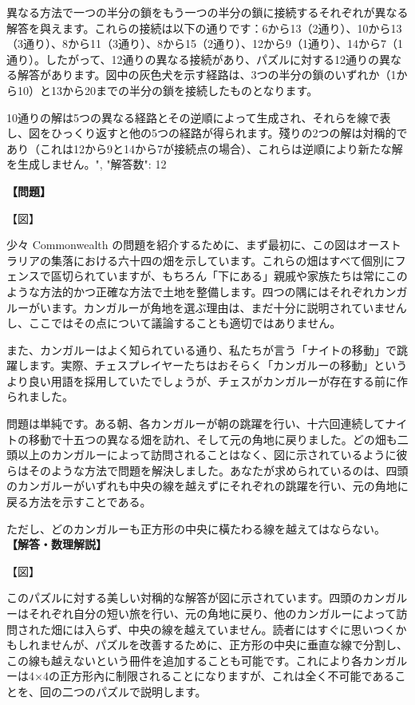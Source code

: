 \documentclass[10pt,a4paper,oneside,openany]{ltjsbook}
\begin{document}
\begin{tcolorbox}[colback=softblue,colframe=primaryblue,title=\textbf{第 336 問：THE GREYHOUND PUZZLE.},arc=2mm,boxrule=1pt,breakable]
{異なる方法で一つの半分の鎖をもう一つの半分の鎖に接続するそれぞれが異なる解答を與えます。これらの接続は以下の通りです：6から13（2通り）、10から13（3通り）、8から11（3通り）、8から15（2通り）、12から9（1通り）、14から7（1通り）。したがって、12通りの異なる接続があり、パズルに対する12通りの異なる解答があります。図中の灰色犬を示す経路は、3つの半分の鎖のいずれか（1から10）と13から20までの半分の鎖を接続したものとなります。

10通りの解は5つの異なる経路とその逆順によって生成され、それらを線で表し、図をひっくり返すと他の5つの経路が得られます。殘りの2つの解は対稱的であり（これは12から9と14から7が接続点の場合）、これらは逆順により新たな解を生成しません。",
"解答数": 12
}
\end{tcolorbox}

\begin{tcolorbox}[colback=softblue,colframe=primaryblue,title=\textbf{第 337 問：四頭のカンガルー （原題: THE FOUR KANGAROOS.）},arc=2mm,boxrule=1pt,breakable]
\textbf{【問題】}\par\vspace{0.3em}
【図】

少々 Commonwealth の問題を紹介するために、まず最初に、この図はオーストラリアの集落における六十四の畑を示しています。これらの畑はすべて個別にフェンスで區切られていますが、もちろん「下にある」親戚や家族たちは常にこのような方法的かつ正確な方法で土地を整備します。四つの隅にはそれぞれカンガルーがいます。カンガルーが角地を選ぶ理由は、まだ十分に説明されていませんし、ここではその点について議論することも適切ではありません。

また、カンガルーはよく知られている通り、私たちが言う「ナイトの移動」で跳躍します。実際、チェスプレイヤーたちはおそらく「カンガルーの移動」というより良い用語を採用していたでしょうが、チェスがカンガルーが存在する前に作られました。

問題は単純です。ある朝、各カンガルーが朝の跳躍を行い、十六回連続してナイトの移動で十五つの異なる畑を訪れ、そして元の角地に戻りました。どの畑も二頭以上のカンガルーによって訪問されることはなく、図に示されているように彼らはそのような方法で問題を解決しました。あなたが求められているのは、四頭のカンガルーがいずれも中央の線を越えずにそれぞれの跳躍を行い、元の角地に戻る方法を示すことである。

ただし、どのカンガルーも正方形の中央に橫たわる線を越えてはならない。
\tcblower
\textbf{【解答・数理解説】}\par\vspace{0.3em}
【図】

このパズルに対する美しい対稱的な解答が図に示されています。四頭のカンガルーはそれぞれ自分の短い旅を行い、元の角地に戻り、他のカンガルーによって訪問された畑には入らず、中央の線を越えていません。読者にはすぐに思いつくかもしれませんが、パズルを改善するために、正方形の中央に垂直な線で分割し、この線も越えないという冊件を追加することも可能です。これにより各カンガルーは4×4の正方形內に制限されることになりますが、これは全く不可能であることを、回の二つのパズルで説明します。
\end{tcolorbox}
\end{document}
